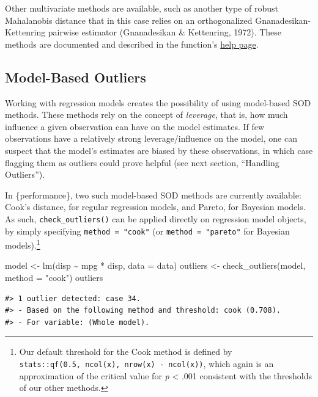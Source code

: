 \documentclass{article}
\newenvironment{Shaded}{\begin{snugshade}}{\end{snugshade}}
\newcommand{\AttributeTok}[1]{\textcolor[rgb]{0.77,0.63,0.00}{#1}}
\newcommand{\FunctionTok}[1]{\textcolor[rgb]{0.00,0.00,0.00}{#1}}
\newcommand{\NormalTok}[1]{#1}
\newcommand{\OtherTok}[1]{\textcolor[rgb]{0.56,0.35,0.01}{#1}}
\newcommand{\SpecialCharTok}[1]{\textcolor[rgb]{0.00,0.00,0.00}{#1}}
\newcommand{\StringTok}[1]{\textcolor[rgb]{0.31,0.60,0.02}{#1}}
\begin{document}
Other multivariate methods are available, such as another type of robust
Mahalanobis distance that in this case relies on an orthogonalized
Gnanadesikan-Kettenring pairwise estimator (Gnanadesikan \& Kettenring,
1972). These methods are documented and described in the function's
\href{https://easystats.github.io/performance/reference/check_outliers.html}{help
page}.

\hypertarget{model-based-outliers}{%
\subsection{Model-Based Outliers}\label{model-based-outliers}}

Working with regression models creates the possibility of using
model-based SOD methods. These methods rely on the concept of
\emph{leverage}, that is, how much influence a given observation can
have on the model estimates. If few observations have a relatively
strong leverage/influence on the model, one can suspect that the model's
estimates are biased by these observations, in which case flagging them
as outliers could prove helpful (see next section, ``Handling
Outliers'').

In \{performance\}, two such model-based SOD methods are currently
available: Cook's distance, for regular regression models, and Pareto,
for Bayesian models. As such, \texttt{check\_outliers()} can be applied
directly on regression model objects, by simply specifying
\texttt{method\ =\ "cook"} (or \texttt{method\ =\ "pareto"} for Bayesian
models).\footnote{Our default threshold for the Cook method is defined
  by \texttt{stats::qf(0.5,\ ncol(x),\ nrow(x)\ -\ ncol(x))}, which
  again is an approximation of the critical value for \emph{p}
  \textless{} .001 consistent with the thresholds of our other methods.}

\begin{Shaded}
\begin{Highlighting}[]
\NormalTok{model }\OtherTok{\textless{}{-}} \FunctionTok{lm}\NormalTok{(disp }\SpecialCharTok{\textasciitilde{}}\NormalTok{ mpg }\SpecialCharTok{*}\NormalTok{ disp, }\AttributeTok{data =}\NormalTok{ data)}
\NormalTok{outliers }\OtherTok{\textless{}{-}} \FunctionTok{check\_outliers}\NormalTok{(model, }\AttributeTok{method =} \StringTok{"cook"}\NormalTok{)}
\NormalTok{outliers}
\end{Highlighting}
\end{Shaded}

\begin{verbatim}
#> 1 outlier detected: case 34.
#> - Based on the following method and threshold: cook (0.708).
#> - For variable: (Whole model).
\end{verbatim}
\end{document}
